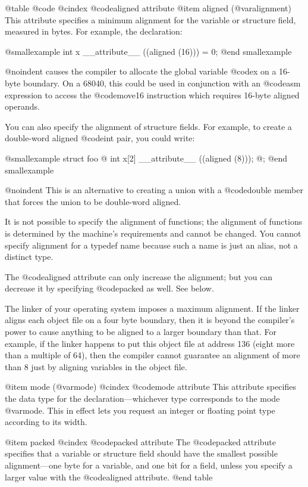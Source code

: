 {@table @code
@cindex @code{aligned} attribute
@item aligned (@var{alignment})
This attribute specifies a minimum alignment for the variable or
structure field, measured in bytes.  For example, the declaration:

@smallexample
int x __attribute__ ((aligned (16))) = 0;
@end smallexample

@noindent
causes the compiler to allocate the global variable @code{x} on a
16-byte boundary.  On a 68040, this could be used in conjunction with
an @code{asm} expression to access the @code{move16} instruction which
requires 16-byte aligned operands.

You can also specify the alignment of structure fields.  For example, to
create a double-word aligned @code{int} pair, you could write:

@smallexample
struct foo @{ int x[2] __attribute__ ((aligned (8))); @};
@end smallexample

@noindent
This is an alternative to creating a union with a @code{double} member
that forces the union to be double-word aligned.

It is not possible to specify the alignment of functions; the alignment
of functions is determined by the machine's requirements and cannot be
changed.  You cannot specify alignment for a typedef name because such a
name is just an alias, not a distinct type.

The @code{aligned} attribute can only increase the alignment; but you
can decrease it by specifying @code{packed} as well.  See below.

The linker of your operating system imposes a maximum alignment.  If the
linker aligns each object file on a four byte boundary, then it is
beyond the compiler's power to cause anything to be aligned to a larger
boundary than that.  For example, if  the linker happens to put this object
file at address 136 (eight more than a multiple of 64), then the compiler
cannot guarantee an alignment of more than 8 just by aligning variables in
the object file.

@item mode (@var{mode})
@cindex @code{mode} attribute
This attribute specifies the data type for the declaration---whichever
type corresponds to the mode @var{mode}.  This in effect lets you
request an integer or floating point type according to its width.

@item packed
@cindex @code{packed} attribute
The @code{packed} attribute specifies that a variable or structure field
should have the smallest possible alignment---one byte for a variable,
and one bit for a field, unless you specify a larger value with the
@code{aligned} attribute.
@end table

}
